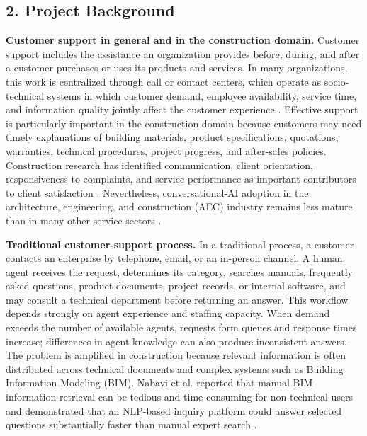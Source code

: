 \documentclass[11pt,a4paper]{article}
\begin{document}
\subsection{2. Project Background}

\textbf{Customer support in general and in the construction domain.}
Customer support includes the assistance an organization provides before,
during, and after a customer purchases or uses its products and services. In
many organizations, this work is centralized through call or contact centers,
which operate as socio-technical systems in which customer demand, employee
availability, service time, and information quality jointly affect the customer
experience \cite{gans2003}. Effective support is particularly important in the
construction domain because customers may need timely explanations of building
materials, product specifications, quotations, warranties, technical
procedures, project progress, and after-sales policies. Construction research
has identified communication, client orientation, responsiveness to complaints,
and service performance as important contributors to client satisfaction
\cite{ahmed1995}. Nevertheless, conversational-AI adoption in the architecture,
engineering, and construction (AEC) industry remains less mature than in many
other service sectors \cite{saka2023}.

\textbf{Traditional customer-support process.}
In a traditional process, a customer contacts an enterprise by telephone,
email, or an in-person channel. A human agent receives the request, determines
its category, searches manuals, frequently asked questions, product documents,
project records, or internal software, and may consult a technical department
before returning an answer. This workflow depends strongly on agent experience
and staffing capacity. When demand exceeds the number of available agents,
requests form queues and response times increase; differences in agent knowledge
can also produce inconsistent answers \cite{gans2003}. The problem is amplified
in construction because relevant information is often distributed across
technical documents and complex systems such as Building Information Modeling
(BIM). Nabavi et al. reported that manual BIM information retrieval can be
tedious and time-consuming for non-technical users and demonstrated that an
NLP-based inquiry platform could answer selected questions substantially faster
than manual expert search \cite{nabavi2023}.
\end{document}
